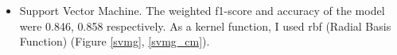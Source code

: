 \documentclass[12pt]{article}
\begin{document}
\begin{itemize}
    \begin{figure}[H]
      \centering
      \hfill
    \end{figure}

    \item Support Vector Machine. The weighted f1-score and accuracy of the model were 0.846, 0.858 respectively. As a kernel function, I used rbf (Radial Basis Function) (Figure \ref{svmg}, \ref{svmg_cm}).


\end{itemize}
\end{document}
